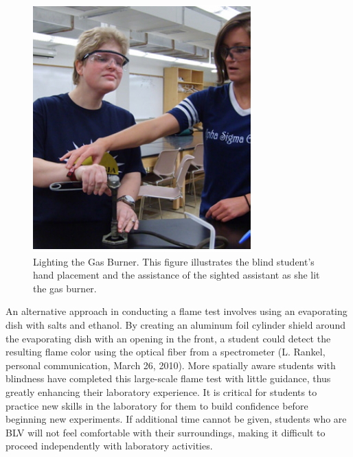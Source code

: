 \documentclass[11.5pt]{sig-alternate} %
\begin{document}
\begin{large}
\begin{figure}[!h]
    \centering
    \includegraphics[width=1\linewidth]{fig2.png}
    \caption{Lighting the Gas Burner. This figure illustrates the blind student’s hand placement and the assistance of the sighted assistant as she lit the gas burner.}
\end{figure}

An alternative approach in conducting a flame test involves using an evaporating dish with salts and ethanol. By creating an aluminum foil cylinder shield around the evaporating dish with an opening in the front, a student could detect the resulting flame color using the optical fiber from a spectrometer (L. Rankel, personal communication, March 26, 2010). More spatially aware students with blindness have completed this large-scale flame test with little guidance, thus greatly enhancing their laboratory experience. It is critical for students to practice new skills in the laboratory for them to build confidence before beginning new experiments. If additional time cannot be given, students who are BLV will not feel comfortable with their surroundings, making it difficult to proceed independently with laboratory activities. 


\end{large}
\end{document}
